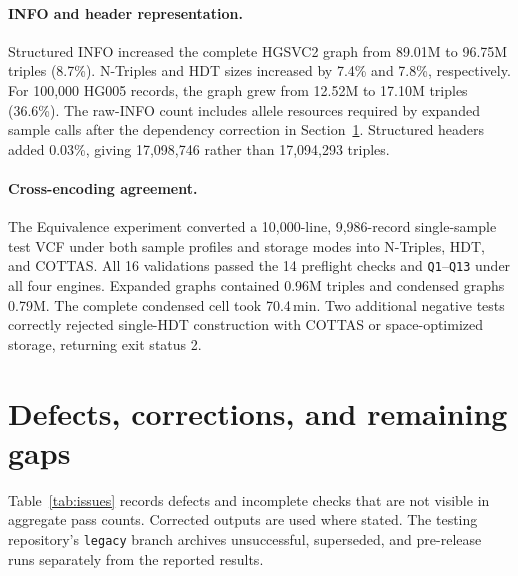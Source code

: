 \documentclass[11pt]{article}
\begin{document}
\paragraph{INFO and header representation.}
Structured INFO increased the complete HGSVC2 graph from 89.01M to 96.75M triples (8.7\%).
N-Triples and HDT sizes increased by 7.4\% and 7.8\%, respectively.
For 100,000 HG005 records, the graph grew from 12.52M to 17.10M triples (36.6\%).
The raw-INFO count includes allele resources required by expanded sample calls after the dependency correction in Section~\ref{sec:issues}.
Structured headers added 0.03\%, giving 17,098,746 rather than 17,094,293 triples.

\paragraph{Cross-encoding agreement.}
The Equivalence experiment converted a 10,000-line, 9,986-record single-sample test VCF under both sample profiles and storage modes into N-Triples, HDT, and COTTAS.
All 16 validations passed the 14 preflight checks and \texttt{Q1}--\texttt{Q13} under all four engines.
Expanded graphs contained 0.96M triples and condensed graphs 0.79M.
The complete condensed cell took 70.4\,min.
Two additional negative tests correctly rejected single-HDT construction with COTTAS or space-optimized storage, returning exit status 2.

\section{Defects, corrections, and remaining gaps}\label{sec:issues}
Table~\ref{tab:issues} records defects and incomplete checks that are not visible in aggregate pass counts.
Corrected outputs are used where stated.
The testing repository's \texttt{legacy} branch archives unsuccessful, superseded, and pre-release runs separately from the reported results.
\end{document}

